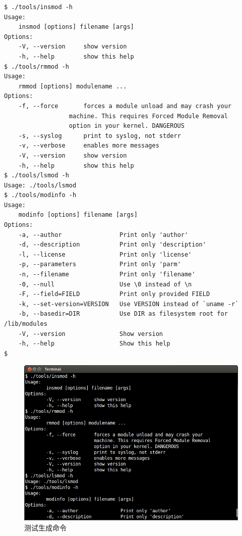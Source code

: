 {\begin{shaded}\begin{verbatim}
$ ./tools/insmod -h
Usage:
    insmod [options] filename [args]
Options:
    -V, --version     show version
    -h, --help        show this help
$ ./tools/rmmod -h
Usage:
    rmmod [options] modulename ...
Options:
    -f, --force       forces a module unload and may crash your
                  machine. This requires Forced Module Removal
                  option in your kernel. DANGEROUS
    -s, --syslog      print to syslog, not stderr
    -v, --verbose     enables more messages
    -V, --version     show version
    -h, --help        show this help
$ ./tools/lsmod -h
Usage: ./tools/lsmod
$ ./tools/modinfo -h
Usage:
    modinfo [options] filename [args]
Options:
    -a, --author                Print only 'author'
    -d, --description           Print only 'description'
    -l, --license               Print only 'license'
    -p, --parameters            Print only 'parm'
    -n, --filename              Print only 'filename'
    -0, --null                  Use \0 instead of \n
    -F, --field=FIELD           Print only provided FIELD
    -k, --set-version=VERSION   Use VERSION instead of `uname -r`
    -b, --basedir=DIR           Use DIR as filesystem root for /lib/modules
    -V, --version               Show version
    -h, --help                  Show this help
$ 
\end{verbatim}\end{shaded}}
\begin{figure}[htbp]
\centering
\includegraphics{./pictures/1-5-test.png}
\caption{测试生成命令}
\end{figure}

